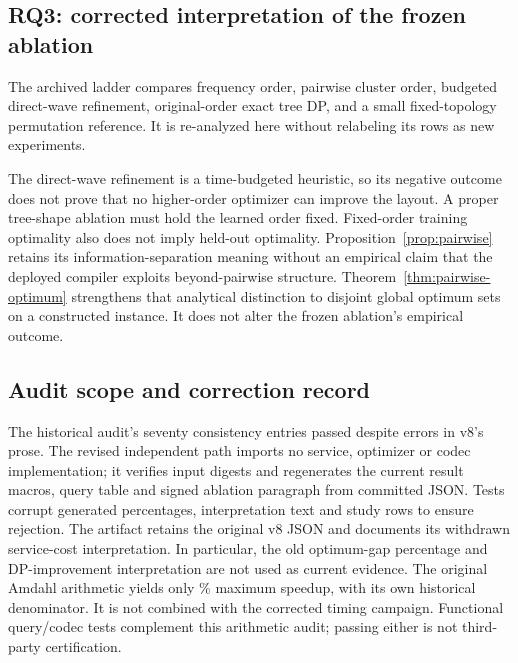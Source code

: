 \subsection{RQ3: corrected interpretation of the frozen ablation}\label{sec:v8hoa}
The archived ladder compares frequency order, pairwise cluster order,
budgeted direct-wave refinement, original-order exact tree DP, and a small
fixed-topology permutation reference. It is re-analyzed here without
relabeling its rows as new experiments.

The direct-wave refinement is a time-budgeted heuristic, so its negative
outcome does not prove that no higher-order optimizer can improve the layout.
A proper tree-shape ablation must hold the learned order fixed. Fixed-order
training optimality also does not imply held-out optimality. Proposition~\ref{prop:pairwise}
retains its information-separation meaning without an empirical claim that
the deployed compiler exploits beyond-pairwise structure.
Theorem~\ref{thm:pairwise-optimum} strengthens that analytical distinction to
disjoint global optimum sets on a constructed instance. It does not alter
the frozen ablation's empirical outcome.

\subsection{Audit scope and correction record}\label{sec:v8audit}
The historical audit's seventy consistency entries passed despite errors in
v8's prose. The revised independent path imports no service, optimizer or
codec implementation; it verifies input digests and regenerates the current
result macros, query table and signed ablation paragraph from committed JSON.
Tests corrupt generated percentages, interpretation text and study rows to
ensure rejection. The artifact retains the original v8 JSON and documents
its withdrawn service-cost interpretation. In particular, the old optimum-gap
percentage and DP-improvement interpretation are not used as current evidence.
The original Amdahl arithmetic yields only \VnineOldAmdahlCeiling\% maximum
speedup, with its own historical denominator. It is not combined with the
corrected timing campaign. Functional query/codec tests complement this
arithmetic audit; passing either is not third-party certification.
